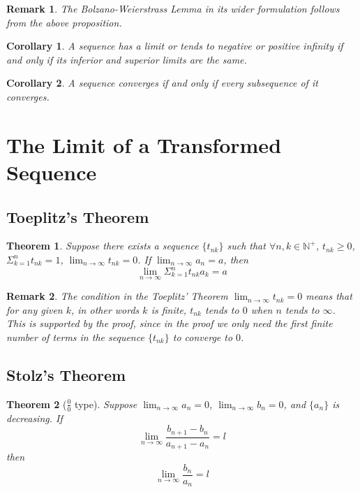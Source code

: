 \documentclass[onecolumn]{ctexart}
\newtheorem{theorem}{Theorem}
\newtheorem{corollary}{Corollary}
\newtheorem{remark}{Remark}
\begin{document}
\begin{remark}
  The Bolzano-Weierstrass Lemma in its wider formulation follows from the above 
  proposition.
\end{remark}

\begin{corollary}
  A sequence has a limit or tends to negative or positive infinity if and only if 
  its inferior and superior limits are the same.
\end{corollary}

\begin{corollary}
  A sequence converges if and only if every subsequence of it converges.
\end{corollary}

\section{The Limit of a Transformed Sequence}

\subsection{Toeplitz's Theorem}

\begin{theorem}
  Suppose there exists a sequence $\{t_{nk}\}$ such that 
  $\forall n, k \in \mathbb{N^+}$, $t_{nk} \geq 0$, $\Sigma_{k=1}^n t_{nk} = 1$, 
  $\lim_{n \to \infty} t_{nk} = 0$. If $\lim_{n \to \infty} a_n = a$, then 
  \[
    \lim_{n \to \infty} \Sigma_{k=1}^n t_{nk} a_k = a
  \]
\end{theorem}

\begin{remark}
  The condition in the Toeplitz' Theorem $\lim_{n \to \infty} t_{nk} = 0$ means 
  that for any given $k$, in other words $k$ is finite, $t_{nk}$ tends to $0$ 
  when $n$ tends to $\infty$. This is supported by the proof, since in the proof 
  we only need the first finite number of terms in the sequence $\{t_{nk}\}$ to 
  converge to $0$.
\end{remark}

\subsection{Stolz's Theorem}

\begin{theorem}[$\frac{0}{0}$ type]
  Suppose $\lim_{n \to \infty} a_n = 0$, $\lim_{n \to \infty} b_n = 0$, and 
  $\{a_n\}$ is decreasing. If 
  \[
    \lim_{n \to \infty} \frac{b_{n+1} - b_n}{a_{n+1} - a_n} = l
  \]
  then 
  \[
    \lim_{n \to \infty} \frac{b_n}{a_n} = l
  \]
\end{theorem}
\end{document}
